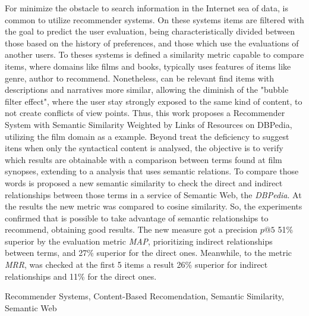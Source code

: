 For minimize the obstacle to search information in the Internet sea of data, is common to utilize recommender systems. On these systems items are filtered with the goal to predict the user evaluation, being characteristically divided between those based on the history of preferences, and those which use the evaluations of another users. To theses systems is defined a similarity metric capable to compare items, where domains like films and books, typically uses features of items like genre, author to recommend. Nonetheless, can be relevant find items with descriptions and narratives more similar, allowing the diminish of the "bubble filter effect", where the user stay strongly exposed to the same kind of content, to not create conflicts of view points. Thus,  this work  proposes a Recommender System with Semantic Similarity Weighted by Links of Resources on DBPedia, utilizing the film domain as a example. Beyond treat the deficiency to suggest itens when only the syntactical content is analysed, the objective is to verify which results are obtainable with a comparison between terms found at film synopses, extending to a analysis that uses semantic relations. To compare those words is proposed a new semantic similarity to check the direct and indirect relationships between those terms in a service of Semantic Web, the \textit{DBPedia}. At the results the new metric was compared to cosine similarity. So, the experiments confirmed that is possible to take advantage of semantic relationships to recommend, obtaining good results. The new measure got a precision $p@5$ 51\% superior by the evaluation metric \textit{MAP}, prioritizing indirect relationships between terms, and 27\% superior for the direct ones. Meanwhile, to the metric \textit{MRR}, was checked at the first 5 items a result 26\% superior for indirect relationships and 11\% for the direct ones.

\begin{keywords}
	Recommender Systems, Content-Based Recomendation, Semantic Similarity, Semantic Web
\end{keywords}